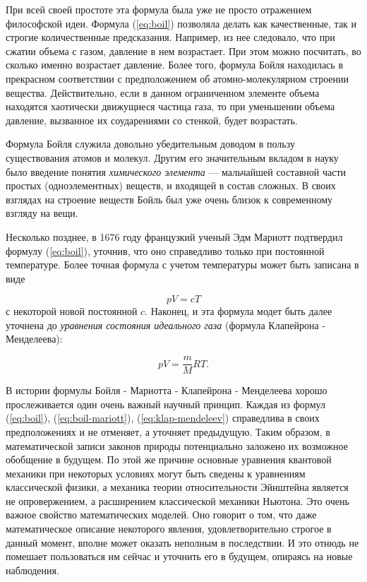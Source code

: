 При всей своей простоте эта формула была уже не просто отражением философской идеи.
Формула (\ref{eq:boil}) позволяла делать как качественные, так и строгие количественные предсказания.
Например, из нее следовало, что при сжатии объема с газом, давление в нем возрастает.
При этом можно посчитать, во сколько именно возрастает давление.
Более того, формула Бойля находилась в прекрасном соответствии с предположением об атомно-молекулярном строении вещества.
Действительно, если в данном ограниченном элементе объема находятся хаотически движущиеся частица газа, то при уменьшении объема давление, вызванное их соударениями со стенкой, будет возрастать.

Формула Бойля служила довольно убедительным доводом в пользу существования атомов и молекул.
Другим его значительным вкладом в науку было введение понятия \textit{химического элемента} — мальчайшей составной части простых (одноэлементных) веществ, и входящей в состав сложных.
В своих взглядах на строение веществ Бойль был уже очень близок к современному взгляду на вещи. 

Несколько позднее, в 1676 году французкий ученый Эдм Мариотт подтвердил формулу (\ref{eq:boil}), уточнив, что оно справедливо только при постоянной температуре.
Более точная формула с учетом температуры может быть записана в виде

\begin{equation}\label{eq:boil-mariott}
pV = cT
\end{equation}
с некоторой новой постоянной $c$. Наконец, и эта формула модет быть далее уточнена до \textit{уравнения состояния идеального газа} (формула Клапейрона - Менделеева):

\begin{equation}\label{eq:klap-mendeleev}
pV = \frac{m}{M}RT.
\end{equation}

В истории формулы Бойля - Мариотта - Клапейрона - Менделеева хорошо прослеживается один очень важный научный принцип.
Каждая из формул (\ref{eq:boil}), (\ref{eq:boil-mariott}), (\ref{eq:klap-mendeleev}) справедлива в своих предположениях и не отменяет, а уточняет предыдущую.
Таким образом, в математической записи законов природы потенциально заложено их возможное обобщение в будущем.
По этой же причине основные уравнения квантовой механики при некоторых условиях могут быть сведены к уравнениям классической физики, а механика теории относительности Эйнштейна является не опровержением, а расширением классической механики Ньютона. 
Это очень важное свойство математических моделей.
Оно говорит о том, что даже математическое описание некоторого явления, удовлетворительно строгое в данный момент, вполне может оказать неполным в последствии.
И это отнюдь не помешает пользоваться им сейчас и уточнить его в будущем, опираясь на новые наблюдения.

